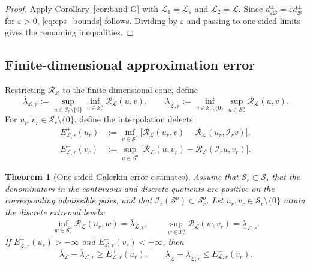\documentclass[preprint,10pt]{elsarticle}
\theoremstyle{plain}
\newtheorem{theorem}{Theorem}
\theoremstyle{definition}
\theoremstyle{remark}
\begin{document}
\begin{proof}
	Apply Corollary~\ref{cor:band-G} with
	\(\mathcal L_1=\mathcal L_\varepsilon\) and
	\(\mathcal L_2=\mathcal L\). Since
	\(d^\pm_{\varepsilon\mathcal B}=\varepsilon d^\pm_{\mathcal B}\) for
	\(\varepsilon>0\), \eqref{eq:eps_bounds} follows. Dividing by
	\(\varepsilon\) and passing to one-sided limits gives the remaining
	inequalities.
\end{proof}

\subsection{Finite-dimensional approximation error}

Restricting \(\mathcal R_{\mathcal L}\) to the finite-dimensional cone, define
\[
\overline\lambda_{\mathcal L,r}
:=
\sup_{u\in\mathcal S_r\setminus\{0\}}
\inf_{v\in\mathcal S_r^o}
\mathcal R_{\mathcal L}(u,v),
\qquad
\underline\lambda_{\mathcal L,r}
:=
\inf_{v\in\mathcal S_r\setminus\{0\}}
\sup_{u\in\mathcal S_r^o}
\mathcal R_{\mathcal L}(u,v).
\]
For \(u_r,v_r\in\mathcal S_r\setminus\{0\}\), define the interpolation
defects
\begin{align}
	E^+_{\mathcal L,r}(u_r)
	&:=
	\inf_{v\in\mathcal S^o}
	\bigl[
	\mathcal R_{\mathcal L}(u_r,v)
	-
	\mathcal R_{\mathcal L}(u_r,\mathcal I_r v)
	\bigr],
	\label{eq:E-plus-short}\\
	E^-_{\mathcal L,r}(v_r)
	&:=
	\sup_{u\in\mathcal S^o}
	\bigl[
	\mathcal R_{\mathcal L}(u,v_r)
	-
	\mathcal R_{\mathcal L}(\mathcal I_r u,v_r)
	\bigr].
	\label{eq:E-minus-short}
\end{align}

\begin{theorem}[One-sided Galerkin error estimates]
	\label{thm:joint-error}
	Assume that \(\mathcal S_r\subset\mathcal S\), that the denominators in the
	continuous and discrete quotients are positive on the corresponding
	admissible pairs, and that
	\(\mathcal I_r(\mathcal S^o)\subset\mathcal S_r^o\). Let
	\(u_r,v_r\in\mathcal S_r\setminus\{0\}\) attain the discrete extremal levels:
	\[
	\inf_{w\in\mathcal S_r^o}
	\mathcal R_{\mathcal L}(u_r,w)
	=
	\overline\lambda_{\mathcal L,r},
	\qquad
	\sup_{w\in\mathcal S_r^o}
	\mathcal R_{\mathcal L}(w,v_r)
	=
	\underline\lambda_{\mathcal L,r}.
	\]
	If
	\(E^+_{\mathcal L,r}(u_r)>-\infty\) and
	\(E^-_{\mathcal L,r}(v_r)<+\infty\), then
	\begin{equation}\label{eq:joint-error-estimates}
		\overline\lambda_{\mathcal L}
		-
		\overline\lambda_{\mathcal L,r}
		\ge
		E^+_{\mathcal L,r}(u_r),
		\qquad
		\underline\lambda_{\mathcal L}
		-
		\underline\lambda_{\mathcal L,r}
		\le
		E^-_{\mathcal L,r}(v_r).
	\end{equation}
\end{theorem}
\end{document}
